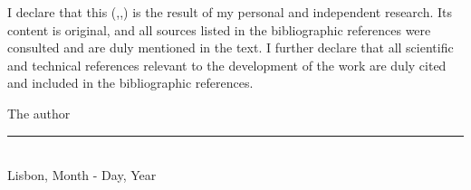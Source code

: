 \makeatletter
I declare that this \MakeLowercase{\thedoctypestr(\iselthesis@opt@docdegree,\iselthesis@opt@doctype,\iselthesis@opt@coverlang)} is the result of my personal and independent research. Its content is original, and all sources listed in the bibliographic references were consulted and are duly mentioned in the text. I further declare that all scientific and technical references relevant to the development of the work are duly cited and included in the bibliographic references.
\makeatother
\begin{center}
The author
\\[3em]

\rule{.5\textwidth}{1pt}
\\[.5em]
\fontsize{10}{12.2}
\selectfont
Lisbon, Month - Day, Year
\end{center}
